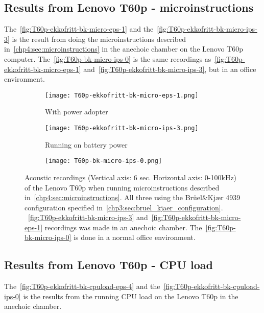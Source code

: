 \subsection{Results from Lenovo T60p - microinstructions}\label{chp5:subsec:t60p_bk_results_micro}
The~\autoref{fig:T60p-ekkofritt-bk-micro-eps-1} and the~\autoref{fig:T60p-ekkofritt-bk-micro-ips-3} is the result from doing the microinstructions described in~\autoref{chp4:sec:microinstructions} in the anechoic chamber on the Lenovo T60p computer. The~\autoref{fig:T60p-bk-micro-ips-0} is the same recordings as~\autoref{fig:T60p-ekkofritt-bk-micro-eps-1} and~\autoref{fig:T60p-ekkofritt-bk-micro-ips-3}, but in an office environment.
\begin{figure}[ht]
	\begin{subfigure}{0.32\textwidth}
	    \centering
	    \texttt{[image: T60p-ekkofritt-bk-micro-eps-1.png]}
	    \caption{With power adopter}
	    \label{fig:T60p-ekkofritt-bk-micro-eps-1}
    \end{subfigure}
    \begin{subfigure}{0.32\textwidth}
	    \centering
    	\texttt{[image: T60p-ekkofritt-bk-micro-ips-3.png]}
    	\caption{Running on battery power}
    	\label{fig:T60p-ekkofritt-bk-micro-ips-3}
    \end{subfigure}
    \begin{subfigure}[ht]{0.32\textwidth}
        \centering
        \texttt{[image: T60p-bk-micro-ips-0.png]}
        \caption{}
        \label{fig:T60p-bk-micro-ips-0}
    \end{subfigure}
    \caption{Acoustic recordings (Vertical axis: 6 sec. Horizontal axis: 0-100kHz) of the Lenovo T60p when running microinstructions described in~\autoref{chp4:sec:microinstructions}. All three using the Brüel\&Kjær 4939 configuration specified in~\autoref{chp3:sec:bruel_kjaer_configuration}. ~\autoref{fig:T60p-ekkofritt-bk-micro-ips-3} and~\autoref{fig:T60p-ekkofritt-bk-micro-eps-1} recordings was made in an anechoic chamber. The~\autoref{fig:T60p-bk-micro-ips-0} is done in a normal office environment. }
	\label{fig:T60p-ekkofritt-bk-micro}
\end{figure}
\subsection{Results from Lenovo T60p - CPU load}\label{chp5:subsec:t60p_bk_results_cpuload}
The~\autoref{fig:T60p-ekkofritt-bk-cpuload-eps-4} and the~\autoref{fig:T60p-ekkofritt-bk-cpuload-ips-0} is the results from the running CPU load on the Lenovo T60p in the anechoic chamber. 

